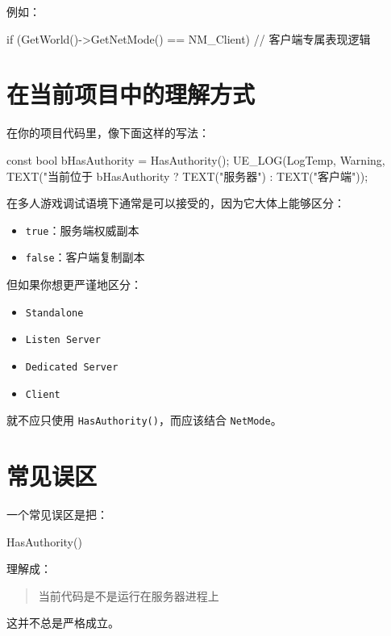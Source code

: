 例如：

\begin{code}
	if (GetWorld()->GetNetMode() == NM_Client)
	{
		// 客户端专属表现逻辑
	}
\end{code}

\section{在当前项目中的理解方式}

在你的项目代码里，像下面这样的写法：

\begin{code}
	const bool bHasAuthority = HasAuthority();
	UE_LOG(LogTemp, Warning, TEXT("当前位于%
	bHasAuthority ? TEXT("服务器") : TEXT("客户端"));
\end{code}

在多人游戏调试语境下通常是可以接受的，因为它大体上能够区分：

\begin{itemize}
	\item \texttt{true}：服务端权威副本
	\item \texttt{false}：客户端复制副本
\end{itemize}

但如果你想更严谨地区分：

\begin{itemize}
	\item \texttt{Standalone}
	\item \texttt{Listen Server}
	\item \texttt{Dedicated Server}
	\item \texttt{Client}
\end{itemize}

就不应只使用 \texttt{HasAuthority()}，而应该结合 \texttt{NetMode}。

\section{常见误区}

一个常见误区是把：

\begin{code}
	HasAuthority()
\end{code}

理解成：

\begin{quote}
	当前代码是不是运行在服务器进程上
\end{quote}

这并不总是严格成立。

